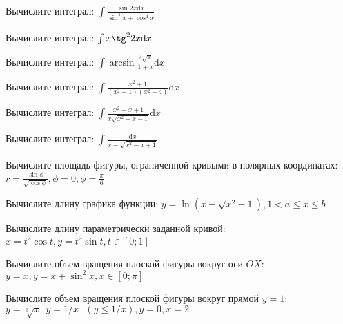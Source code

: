 \documentclass[russian]{article}
\newcommand{\dx}{\text{d}x}
\begin{document}
Вычислите интеграл:
$\int\frac{\sin 2x \dx}{\sin^4 x + \cos^4 x}$

Вычислите интеграл:
$\int x \tg^2 2x \dx$

Вычислите интеграл:
$\int \arcsin \frac{2\sqrt{x}}{1 + x} \dx$



Вычислите интеграл:
$\int \frac{x^2 + 1}{(x^2 - 1)(x^2 - 4)} \dx$

Вычислите интеграл:
$\int \frac{x^2 + x + 1}{x \sqrt{x^2 - x - 1}} \dx$

Вычислите интеграл:
$\int \frac{\dx}{x - \sqrt{x^2 - x + 1}}$



Вычислите площадь фигуры, ограниченной кривыми в полярных координатах:
$r = \frac{\sin \phi}{\sqrt{\cos \phi}}, \phi = 0, \phi = \frac{\pi}{6}$

Вычислите длину графика функции:
$y = \ln(x - \sqrt{x^2 - 1}), 1 < a \le x \le b$

Вычислите длину параметрически заданной кривой:
$x = t^2 \cos t, y = t^2 \sin t, t \in [0; 1]$


Вычислите объем вращения плоской фигуры вокруг оси $OX$:
$y = x, y = x + \sin^2 x, x \in [0;\pi]$

Вычислите объем вращения плоской фигуры вокруг прямой $y = 1$:
$y = \sqrt[3]{x}, y = 1/x \text{ }(y \le 1/x), y = 0, x = 2$
\end{document}
